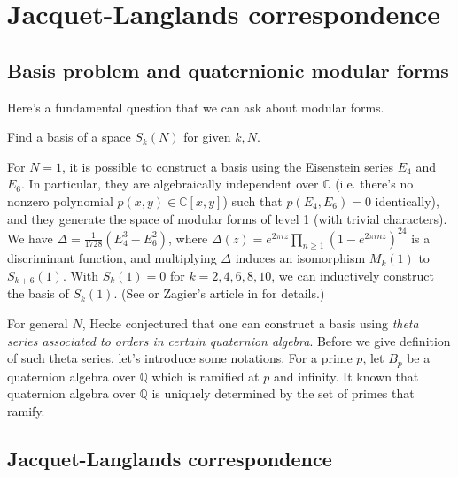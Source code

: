 \chapter{Jacquet-Langlands correspondence}

\section{Basis problem and quaternionic modular forms}

Here's a fundamental question that we can ask about modular forms.

\begin{question}
Find a basis of a space $S_{k}(N)$ for given $k, N$.
\end{question}

For $N = 1$, it is possible to construct a basis using the Eisenstein series $E_{4}$ and $E_{6}$.
In particular, they are algebraically independent over $\mathbb{C}$ (i.e. there's no nonzero polynomial $p(x, y) \in \mathbb{C}[x, y]$)
such that $p(E_{4}, E_{6}) = 0$ identically), and they generate the space of modular forms of level 1 (with trivial characters).
We have $\Delta = \frac{1}{1728}(E_{4}^{3} - E_{6}^{2})$, where $\Delta(z) = e^{2\pi i z}\prod_{n\geq 1}(1 - e^{2\pi i n z})^{24}$ is a 
discriminant function, and multiplying $\Delta$ induces an isomorphism $M_{k}(1)$ to $S_{k+6}(1)$.
With $S_{k}(1) = 0$ for $k = 2, 4, 6, 8, 10$, we can inductively construct the basis of $S_{k}(1)$.
(See \cite{serre2012course} or Zagier's article in \cite{bruinier20081} for details.)

For general $N$, Hecke \cite{Hecke1940AnalytischeAD} conjectured that one can construct a basis using \emph{theta series associated to
orders in certain quaternion algebra}.
Before we give definition of such theta series, let's introduce some notations.
For a prime $p$, let $B_{p}$ be a quaternion algebra over $\mathbb{Q}$ which is ramified at $p$ and infinity.
It known that quaternion algebra over $\mathbb{Q}$ is uniquely determined by the set of primes that ramify.

\cite{eichler1973basis}


\section{Jacquet-Langlands correspondence}

